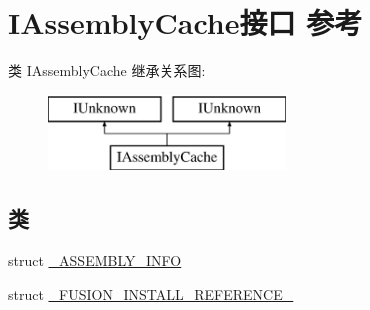 \hypertarget{interface_i_assembly_cache}{}\section{I\+Assembly\+Cache接口 参考}
\label{interface_i_assembly_cache}
类 I\+Assembly\+Cache 继承关系图\+:\begin{figure}[H]
\begin{center}
\leavevmode
\includegraphics[height=2.000000cm]{interface_i_assembly_cache}
\end{center}
\end{figure}
\subsection*{类}
\begin{DoxyCompactItemize}
\item 
struct \hyperlink{struct_i_assembly_cache_1_1___a_s_s_e_m_b_l_y___i_n_f_o}{\+\_\+\+A\+S\+S\+E\+M\+B\+L\+Y\+\_\+\+I\+N\+FO}
\item 
struct \hyperlink{struct_i_assembly_cache_1_1___f_u_s_i_o_n___i_n_s_t_a_l_l___r_e_f_e_r_e_n_c_e__}{\+\_\+\+F\+U\+S\+I\+O\+N\+\_\+\+I\+N\+S\+T\+A\+L\+L\+\_\+\+R\+E\+F\+E\+R\+E\+N\+C\+E\+\_\+}
\end{DoxyCompactItemize}
